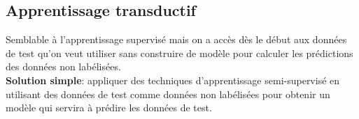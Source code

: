 \subsection{Apprentissage transductif}
Semblable à l'apprentissage supervisé mais on a accès dès le début aux données de test qu'on veut utiliser sans construire de modèle pour calculer les prédictions des données non labélisées.\\
\textbf{Solution simple}: appliquer des techniques d'apprentissage semi-supervisé en utilisant des données de test comme données non labélisées pour obtenir un modèle qui servira à prédire les données de test.
